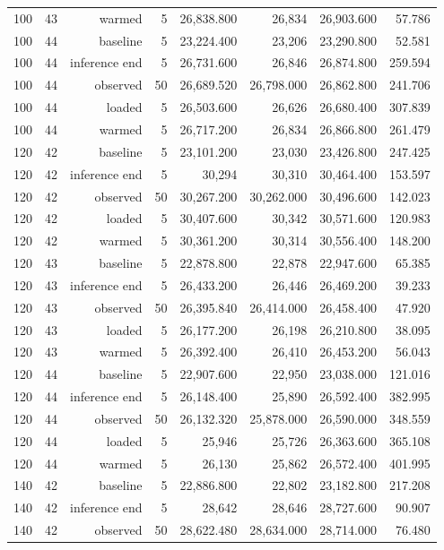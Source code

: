 \documentclass[10pt,a4paper]{article}
\begin{document}
\begin{longtable}{@{}lrrrrrrr@{}}
100 & 43 & warmed & 5 & 26,838.800 & 26,834 & 26,903.600 & 57.786 \\
100 & 44 & baseline & 5 & 23,224.400 & 23,206 & 23,290.800 & 52.581 \\
100 & 44 & inference end & 5 & 26,731.600 & 26,846 & 26,874.800 & 259.594 \\
100 & 44 & observed & 50 & 26,689.520 & 26,798.000 & 26,862.800 & 241.706 \\
100 & 44 & loaded & 5 & 26,503.600 & 26,626 & 26,680.400 & 307.839 \\
100 & 44 & warmed & 5 & 26,717.200 & 26,834 & 26,866.800 & 261.479 \\
120 & 42 & baseline & 5 & 23,101.200 & 23,030 & 23,426.800 & 247.425 \\
120 & 42 & inference end & 5 & 30,294 & 30,310 & 30,464.400 & 153.597 \\
120 & 42 & observed & 50 & 30,267.200 & 30,262.000 & 30,496.600 & 142.023 \\
120 & 42 & loaded & 5 & 30,407.600 & 30,342 & 30,571.600 & 120.983 \\
120 & 42 & warmed & 5 & 30,361.200 & 30,314 & 30,556.400 & 148.200 \\
120 & 43 & baseline & 5 & 22,878.800 & 22,878 & 22,947.600 & 65.385 \\
120 & 43 & inference end & 5 & 26,433.200 & 26,446 & 26,469.200 & 39.233 \\
120 & 43 & observed & 50 & 26,395.840 & 26,414.000 & 26,458.400 & 47.920 \\
120 & 43 & loaded & 5 & 26,177.200 & 26,198 & 26,210.800 & 38.095 \\
120 & 43 & warmed & 5 & 26,392.400 & 26,410 & 26,453.200 & 56.043 \\
120 & 44 & baseline & 5 & 22,907.600 & 22,950 & 23,038.000 & 121.016 \\
120 & 44 & inference end & 5 & 26,148.400 & 25,890 & 26,592.400 & 382.995 \\
120 & 44 & observed & 50 & 26,132.320 & 25,878.000 & 26,590.000 & 348.559 \\
120 & 44 & loaded & 5 & 25,946 & 25,726 & 26,363.600 & 365.108 \\
120 & 44 & warmed & 5 & 26,130 & 25,862 & 26,572.400 & 401.995 \\
140 & 42 & baseline & 5 & 22,886.800 & 22,802 & 23,182.800 & 217.208 \\
140 & 42 & inference end & 5 & 28,642 & 28,646 & 28,727.600 & 90.907 \\
140 & 42 & observed & 50 & 28,622.480 & 28,634.000 & 28,714.000 & 76.480 \\

\end{longtable}
\end{document}
